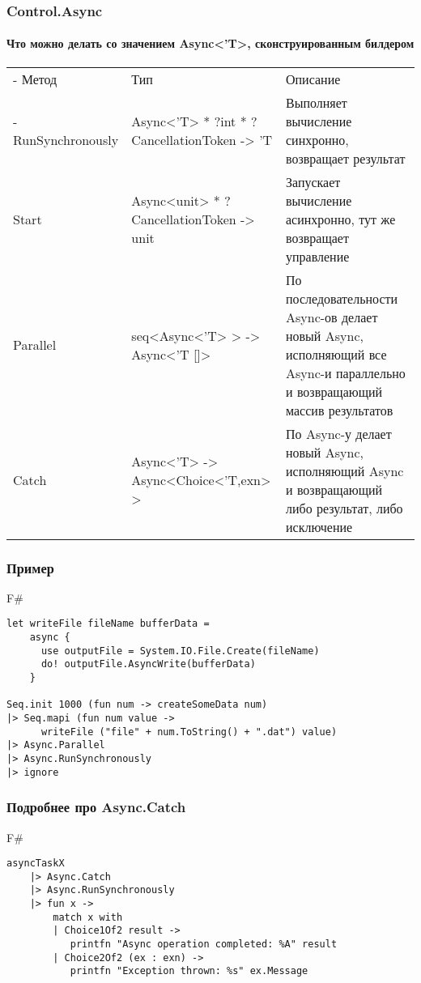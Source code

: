 \documentclass[xetex,mathserif,serif]{beamer}
\begin{document}
	\begin{frame}
		\frametitle{Control.Async}
		\framesubtitle{Что можно делать со значением Async<'T>, сконструированным билдером}
		\begin{footnotesize}
			\begin{tabu} {| X[0.7 l p] | X[1 l p] | X[1 l p] |}
				\tabucline-
				Метод              & Тип                                         & Описание           \\
				\tabucline-
				\everyrow{\tabucline-}
				RunSynchronously   & Async<'T> * ?int * ?CancellationToken -> 'T & Выполняет вычисление синхронно, возвращает результат \\
				Start              & Async<unit> * ?CancellationToken -> unit    & Запускает вычисление асинхронно, тут же возвращает управление \\
				Parallel           & seq<Async<'T> > -> Async<'T []>             & По последовательности Async-ов делает новый Async, исполняющий все Async-и параллельно и возвращающий массив результатов \\
				Catch              & Async<'T> -> Async<Choice<'T,exn> >         & По Async-у делает новый Async, исполняющий Async и возвращающий либо результат, либо исключение \\
   			\end{tabu}
		\end{footnotesize}
	\end{frame}
	
	\begin{frame}[fragile]
		\frametitle{Пример}
   		\begin{exampleblock}{F\#}
   			\begin{lstlisting}
let writeFile fileName bufferData =
    async {
      use outputFile = System.IO.File.Create(fileName)
      do! outputFile.AsyncWrite(bufferData) 
    }

Seq.init 1000 (fun num -> createSomeData num)
|> Seq.mapi (fun num value -> 
      writeFile ("file" + num.ToString() + ".dat") value)
|> Async.Parallel
|> Async.RunSynchronously
|> ignore
\end{lstlisting}
\end{exampleblock}
\end{frame}	
	
	\begin{frame}[fragile]
		\frametitle{Подробнее про Async.Catch}
   		\begin{exampleblock}{F\#}
   			\begin{lstlisting}
asyncTaskX
    |> Async.Catch
    |> Async.RunSynchronously
    |> fun x ->
        match x with
        | Choice1Of2 result -> 
           printfn "Async operation completed: %A" result
        | Choice2Of2 (ex : exn) -> 
           printfn "Exception thrown: %s" ex.Message
\end{lstlisting}
\end{exampleblock}
\end{frame}
	
\end{document}
